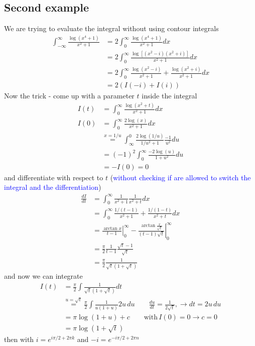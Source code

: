 \documentclass[10pt,a4paper]{book}
\theoremstyle{definition}
\begin{document}
\subsection{Second example}
We are trying to evaluate the integral without using contour integrals
\begin{align}
\int_{-\infty}^{\infty}\frac{\log(x^4+1)}{x^2+1}
&=2\int_0^{\infty}\frac{\log(x^4+1)}{x^2+1}dx\\
&=2\int_0^{\infty}\frac{\log[(x^2-i)(x^2+i)]}{x^2+1}dx\\
&=2\int_0^{\infty}\frac{\log(x^2-i)}{x^2+1}+\frac{\log(x^2+i)}{x^2+1}dx\\
&=2\left(I(-i)+I(i)\right)
\end{align}
Now the trick - come up with a parameter $t$ inside the integral
\begin{align}
I(t)&=\int_0^{\infty}\frac{\log(x^2+t)}{x^2+1}dx\\
I(0)&=\int_0^{\infty}\frac{2\log(x)}{x^2+1}dx\\
&\overset{x=1/u}{=}\int_\infty^0\frac{2\log(1/u)}{1/u^2+1}\frac{-1}{u^2}du\\
&=(-1)^2\int_0^{\infty}\frac{-2\log(u)}{1+u^2}du\\
&=-I(0)=0
\end{align}
and differentiate with respect to $t$ (\textcolor{blue}{without checking if are allowed to switch the integral and the differentiation})
\begin{align}
\frac{dI}{dt}
&=\int_0^{\infty}\frac{1}{x^2+1}\frac{1}{x^2+t}dx\\
&=\int_0^{\infty}\frac{1/(t-1)}{x^2+1}+\frac{1/(1-t)}{x^2+t}dx\\
&=\left.\frac{\arctan x}{t-1}\right|_0^\infty-\left.\frac{\arctan \frac{x}{\sqrt{t}}}{(t-1)\sqrt{t}}\right|_0^\infty\\
&=\frac{\pi}{2}\frac{1}{t-1}\frac{\sqrt{t}-1}{\sqrt{t}}\\
&=\frac{\pi}{2}\frac{1}{\sqrt{t}(1+\sqrt{t})}
\end{align}
and now we can integrate
\begin{align}
I(t)
&=\frac{\pi}{2}\int\frac{1}{\sqrt{t}(1+\sqrt{t})}dt\\
&\overset{u=\sqrt{t}}{=}\frac{\pi}{2}\int\frac{1}{u(1+u)}2u\,du\qquad\frac{du}{dt}=\frac{1}{2\sqrt{t}},\rightarrow dt=2u\,du\\
&=\pi\log(1+u)+c\qquad\text{with}\,I(0)=0\rightarrow c=0\\
&=\pi\log(1+\sqrt{t})
\end{align}
then with $i=e^{i\pi/2+2\pi k}$ and $-i=e^{-i\pi/2+2\pi n}$
\end{document}
